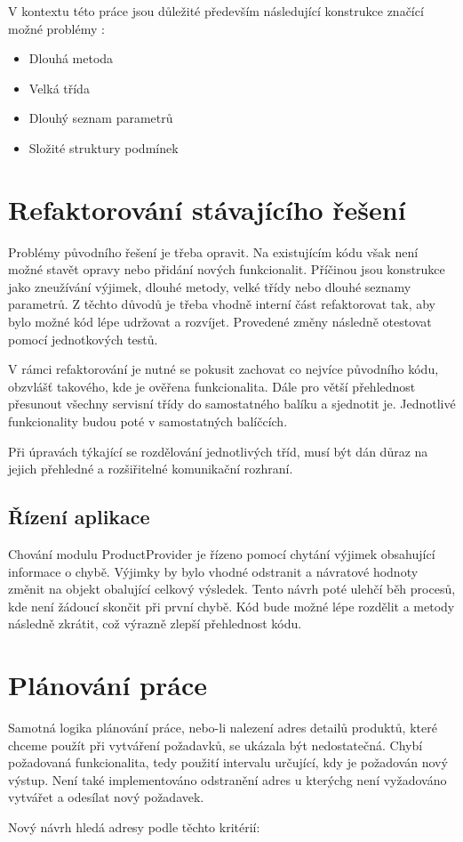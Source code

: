 \documentclass[thesis=B,czech]{FITthesis}[2012/06/26]
\begin{document}
V kontextu této práce jsou důležité především následující konstrukce značící možné problémy \cite{refaktoring}:  
\begin{itemize}
\item Dlouhá metoda
\item Velká třída
\item Dlouhý seznam parametrů
\item Složité struktury podmínek
\end{itemize}

\section{Refaktorování stávajícího řešení}
Problémy původního řešení je třeba opravit. Na existujícím kódu však není možné stavět opravy nebo přidání nových funkcionalit. Příčinou jsou konstrukce jako zneužívání výjimek, dlouhé metody, velké třídy nebo dlouhé seznamy parametrů.
Z těchto důvodů je třeba vhodně interní část refaktorovat tak, aby bylo možné kód lépe udržovat a rozvíjet. Provedené změny následně 
otestovat pomocí jednotkových testů.
\par
V rámci refaktorování je nutné se pokusit zachovat co nejvíce původního kódu, obzvlášť takového, kde je ověřena funkcionalita.
Dále pro větší přehlednost přesunout všechny servisní třídy do samostatného balíku a sjednotit je. Jednotlivé funkcionality
budou poté v samostatných balíčcích.
\par
Při úpravách týkající se rozdělování jednotlivých tříd, musí být dán důraz na jejich přehledné a rozšiřitelné komunikační rozhraní.

\subsection{Řízení aplikace}
Chování modulu ProductProvider je řízeno pomocí chytání výjimek obsahující informace o chybě. 
Výjimky by bylo vhodné odstranit a návratové hodnoty změnit na objekt obalující celkový výsledek. Tento návrh poté ulehčí běh procesů, kde není žádoucí
skončit při první chybě. Kód bude možné lépe rozdělit a metody následně zkrátit, což výrazně zlepší přehlednost kódu.

\section{Plánování práce}
Samotná logika plánování práce, nebo-li nalezení adres detailů produktů, které chceme použít při vytváření požadavků, se ukázala být nedostatečná. Chybí požadovaná funkcionalita, tedy použití intervalu určující, kdy je požadován nový výstup. Není také implementováno odstranění adres u kterýchg není vyžadováno vytvářet a odesílat nový požadavek.
\par
Nový návrh hledá adresy podle těchto kritérií:
\end{document}
